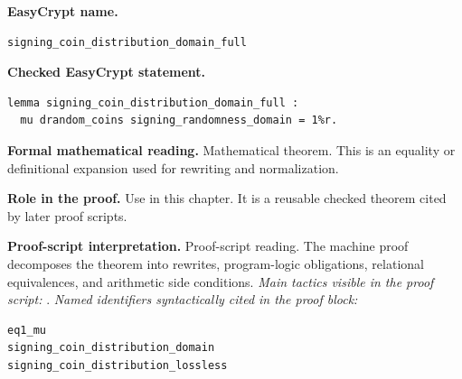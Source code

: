 \begin{formaltheorem}
\noindent\textbf{EasyCrypt name.}
\begin{lstlisting}[language=EasyCrypt,basicstyle=\ttfamily\scriptsize]
signing_coin_distribution_domain_full
\end{lstlisting}
\noindent\textbf{Checked EasyCrypt statement.}
\begin{lstlisting}[language=EasyCrypt,basicstyle=\ttfamily\scriptsize]
lemma signing_coin_distribution_domain_full :
  mu drandom_coins signing_randomness_domain = 1%r.
\end{lstlisting}
\noindent\textbf{Formal mathematical reading.}
Mathematical theorem. This is an equality or definitional expansion used for rewriting and normalization.

\noindent\textbf{Role in the proof.}
Use in this chapter. It is a reusable checked theorem cited by later proof scripts.

\noindent\textbf{Proof-script interpretation.}
Proof-script reading. The machine proof decomposes the theorem into rewrites, program-logic obligations, relational equivalences, and arithmetic side conditions.
\emph{Main tactics visible in the proof script:} .
\emph{Named identifiers syntactically cited in the proof block:}
\begin{lstlisting}[language=EasyCrypt,basicstyle=\ttfamily\scriptsize]
eq1_mu
signing_coin_distribution_domain
signing_coin_distribution_lossless
\end{lstlisting}

\end{formaltheorem}

